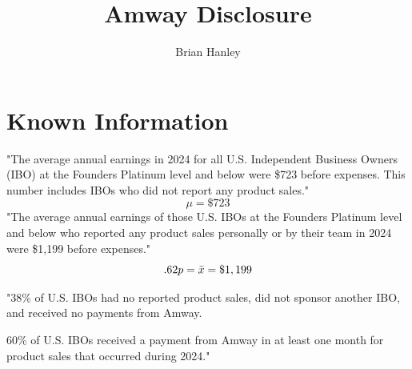 \documentclass[12pt,letterpaper]{article}
\title{\textbf{Amway Disclosure}}
\author{Brian Hanley}
\begin{document}
	\maketitle
	
	\section{Known Information}
	"The average annual earnings in 2024 for all U.S. Independent Business Owners (IBO) at the Founders Platinum level and below were \$723 before expenses. This number includes IBOs who did not report any product sales."  
	$$\mu  = \$723$$
	"The average annual earnings of those U.S. IBOs at the Founders Platinum level and below who reported any product sales personally or by their team in 2024 were \$1,199 before expenses."
	$$.62p  = \\ 
	\bar{x} = \$1,199$$
	
"38\% of U.S. IBOs had no reported product sales, did not sponsor another IBO, and received no payments from Amway. 
 
	60\% of U.S. IBOs received a payment from Amway in at least one month for product sales that occurred during 2024."
	
\end{document}
